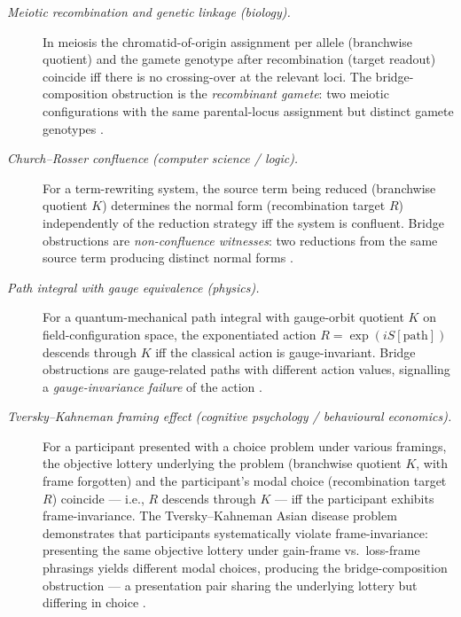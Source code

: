 \documentclass[11pt]{article}
\theoremstyle{definition}
\begin{document}
\begin{description}
\item[\emph{Meiotic recombination and genetic linkage (biology).}]
In meiosis the chromatid-of-origin assignment per allele
(branchwise quotient) and the gamete genotype after recombination
(target readout) coincide iff there is no crossing-over at the
relevant loci.  The bridge-composition obstruction is the
\emph{recombinant gamete}: two meiotic configurations with the
same parental-locus assignment but distinct gamete genotypes
\citep{Morgan1911Coupling}.

\item[\emph{Church--Rosser confluence (computer science / logic).}]
For a term-rewriting system, the source term being reduced
(branchwise quotient \(K\)) determines the normal form
(recombination target \(R\)) independently of the reduction
strategy iff the system is confluent.  Bridge obstructions are
\emph{non-confluence witnesses}: two reductions from the same
source term producing distinct normal forms
\citep{ChurchRosser1936Conversion}.

\item[\emph{Path integral with gauge equivalence (physics).}]
For a quantum-mechanical path integral with gauge-orbit
quotient \(K\) on field-configuration space, the exponentiated
action \(R = \exp(iS[\text{path}])\) descends through \(K\) iff
the classical action is gauge-invariant.  Bridge obstructions are
gauge-related paths with different action values, signalling a
\emph{gauge-invariance failure} of the action
\citep{FeynmanHibbs1965PathIntegrals}.

\item[\emph{Tversky--Kahneman framing effect (cognitive psychology
/ behavioural economics).}]
For a participant presented with a choice problem under various
framings, the objective lottery underlying the problem (branchwise
quotient \(K\), with frame forgotten) and the participant's modal
choice (recombination target \(R\)) coincide --- i.e., \(R\)
descends through \(K\) --- iff the participant exhibits
frame-invariance.  The Tversky--Kahneman Asian disease problem
demonstrates that participants systematically violate
frame-invariance: presenting the same objective lottery under
gain-frame vs.\ loss-frame phrasings yields different modal
choices, producing the bridge-composition obstruction --- a
presentation pair sharing the underlying lottery but differing in
choice
\citep{TverskyKahneman1981Framing}.
\end{description}
\end{document}
